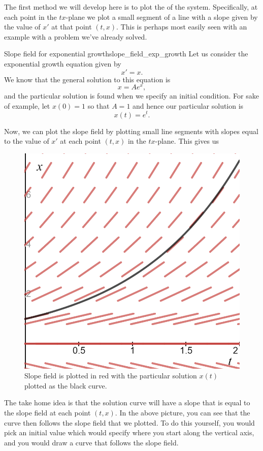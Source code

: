             The first method we will develop here is to plot the   of the system.  Specifically, at each point in the $tx$-plane we plot a small segment of a line with a slope given by the value of $x'$ at that point $(t,x)$.  This is perhaps most easily seen with an example with a problem we've already solved.

            \begin{ex}{Slope field for exponential growth}{slope_field_exp_growth}
                Let us consider the exponential growth equation given by
                \[
                x'=x.
                \]
                We know that the general solution to this equation is
                \[
                x=Ae^x,
                \]
                and the particular solution is found when we specify an initial condition. For sake of example, let $x(0)=1$ so that $A=1$ and hence our particular solution is
                \[
                x(t)=e^t.
                \]

                Now, we can plot the slope field by plotting small line segments with slopes equal to the value of $x'$ at each point $(t,x)$ in the $tx$-plane. This gives us
                \begin{figure}[H]
                    \centering
                    \includegraphics[width=.6\textwidth]{Figures_Part_1/slope_field_exp_growth.png}
                    \caption{Slope field is plotted in red with the particular solution $x(t)$ plotted as the black curve.}
                \end{figure}

                The take home idea is that the solution curve will have a slope that is equal to the slope field at each point $(t,x)$. In the above picture, you can see that the curve then follows the slope field that we plotted. To do this yourself, you would pick an initial value which would specify where you start along the vertical axis, and you would draw a curve that follows the slope field.
            \end{ex}

